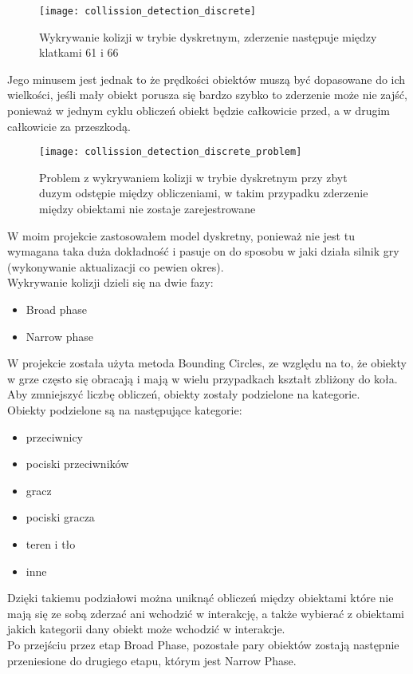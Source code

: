\begin{figure}[h]
	\centering
	\noindent\texttt{[image: collission\_detection\_discrete]}
	\caption{Wykrywanie kolizji w trybie dyskretnym, zderzenie następuje między klatkami 61 i 66}
\end{figure}

Jego minusem jest jednak to że prędko\'sci obiektów muszą być dopasowane do ich wielko\'sci, je\'sli mały obiekt porusza się bardzo szybko to zderzenie może nie zaj\'sć, ponieważ w jednym cyklu obliczeń obiekt będzie całkowicie przed, a w drugim całkowicie za przeszkodą.\\

\begin{figure}[h]
	\centering
	\noindent\texttt{[image: collission\_detection\_discrete\_problem]}
	\caption{Problem z wykrywaniem kolizji w trybie dyskretnym przy zbyt duzym odstępie między obliczeniami, w takim przypadku zderzenie między obiektami nie zostaje zarejestrowane}
\end{figure}
\newpage

\noindent W moim projekcie zastosowałem model dyskretny, ponieważ nie jest tu wymagana taka duża dokładno\'sć i pasuje on do sposobu w jaki działa silnik gry (wykonywanie aktualizacji co pewien okres).\\

\noindent Wykrywanie kolizji dzieli się na dwie fazy:\begin{itemize}[topsep=0.2em, itemsep=0.5em, partopsep=0em, parsep=0em]
	\item Broad phase
	\item Narrow phase
\end{itemize}\bigskip



W projekcie została użyta metoda Bounding Circles, ze względu na to, że obiekty w grze często się obracają i mają w wielu przypadkach kształt zbliżony do koła. Aby zmniejszyć liczbę obliczeń, obiekty zostały podzielone na kategorie.\\

\noindent Obiekty podzielone są na następujące kategorie:\begin{itemize}[topsep=0.2em, itemsep=0.5em, partopsep=0em, parsep=0em]
	\item przeciwnicy
	\item pociski przeciwników
	\item gracz
	\item pociski gracza
	\item teren i tło
	\item inne
\end{itemize}

\noindent Dzięki takiemu podziałowi można uniknąć obliczeń między obiektami które nie mają się ze sobą zderzać ani wchodzić w interakcję, a także wybierać z obiektami jakich kategorii dany obiekt może wchodzić w interakcje.\\
Po przej\'sciu przez etap Broad Phase, pozostałe pary obiektów zostają następnie przeniesione do drugiego etapu, którym jest Narrow Phase.\\



\newpage
\cleardoublepage